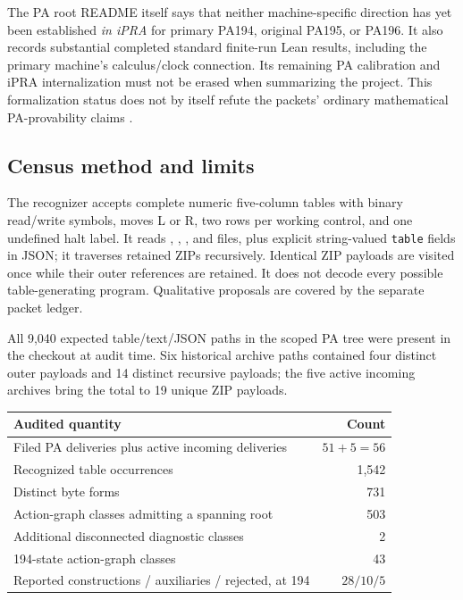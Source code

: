 \documentclass[11pt,letterpaper]{article}
\begin{document}
The PA root README itself says that neither machine-specific direction
has yet been established \emph{in iPRA} for primary PA194, original PA195,
or PA196. It also records substantial completed standard finite-run
Lean results, including the primary machine's calculus/clock connection.
Its remaining PA calibration and iPRA internalization must not be erased
when summarizing the project. This formalization status does not by itself
refute the packets' ordinary mathematical PA-provability claims
\cite{pa-root,primary}.

\subsection{Census method and limits}

The recognizer accepts complete numeric five-column tables with binary
read/write symbols, moves L or R, two rows per working control, and one
undefined halt label. It reads , , , and
 files, plus explicit string-valued \texttt{table} fields in
JSON; it traverses retained ZIPs recursively. Identical ZIP payloads are
visited once while their outer references are retained. It does not
decode every possible table-generating program. Qualitative proposals
are covered by the separate packet ledger.

All 9,040 expected table/text/JSON paths in the scoped PA tree were present
in the checkout at audit time. Six historical archive paths contained
four distinct outer payloads and 14 distinct recursive payloads; the five
active incoming archives bring the total to 19 unique ZIP payloads.

\begin{center}
\begin{tabular}{lr}
\toprule
Audited quantity & Count\\\midrule
Filed PA deliveries plus active incoming deliveries & $51+5=56$\\
Recognized table occurrences & 1,542\\
Distinct byte forms & 731\\
Action-graph classes admitting a spanning root & 503\\
Additional disconnected diagnostic classes & 2\\
194-state action-graph classes & 43\\
Reported constructions / auxiliaries / rejected, at 194 & $28/10/5$\\
\bottomrule
\end{tabular}
\end{center}
\end{document}
